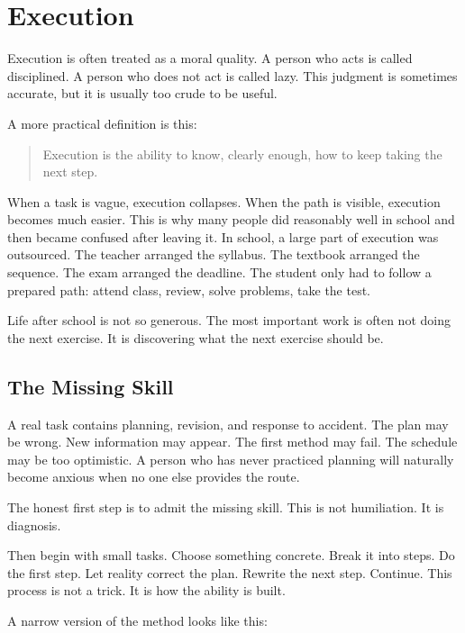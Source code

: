 \chapter{Execution}

Execution is often treated as a moral quality. A person who acts is called disciplined. A person who does not act is called lazy. This judgment is sometimes accurate, but it is usually too crude to be useful.

A more practical definition is this:

\begin{quote}
Execution is the ability to know, clearly enough, how to keep taking the next step.
\end{quote}

When a task is vague, execution collapses. When the path is visible, execution becomes much easier. This is why many people did reasonably well in school and then became confused after leaving it. In school, a large part of execution was outsourced. The teacher arranged the syllabus. The textbook arranged the sequence. The exam arranged the deadline. The student only had to follow a prepared path: attend class, review, solve problems, take the test.

Life after school is not so generous. The most important work is often not doing the next exercise. It is discovering what the next exercise should be.

\section*{The Missing Skill}

A real task contains planning, revision, and response to accident. The plan may be wrong. New information may appear. The first method may fail. The schedule may be too optimistic. A person who has never practiced planning will naturally become anxious when no one else provides the route.

The honest first step is to admit the missing skill. This is not humiliation. It is diagnosis.

Then begin with small tasks. Choose something concrete. Break it into steps. Do the first step. Let reality correct the plan. Rewrite the next step. Continue. This process is not a trick. It is how the ability is built.

A narrow version of the method looks like this:

